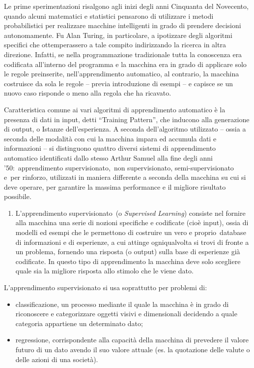 \documentclass[
  b5paper,
  twoside,
  11pt,
  chapterprefix=false,
  bibliography=totocnumbered,
  listof=flat]{scrbook}
\providecommand{\tightlist}{%
  \setlength{\itemsep}{0pt}\setlength{\parskip}{0pt}}
\begin{document}
Le prime sperimentazioni risalgono agli inizi degli anni Cinquanta del
Novecento, quando alcuni matematici e statistici pensarono di utilizzare
i metodi probabilistici per realizzare macchine intelligenti in grado di
prendere decisioni autonomamente. Fu Alan Turing, in particolare, a
ipotizzare degli algoritmi specifici che ottemperassero a tale compito
indirizzando la ricerca in altra direzione. Infatti, se nella
programmazione tradizionale tutta la conoscenza era codificata
all'interno del programma e la macchina era in grado di applicare solo
le regole preinserite, nell'apprendimento automatico, al contrario, la
macchina costruisce da sola le regole -- previa introduzione di esempi
-- e capisce se un nuovo caso risponde o meno alla regola che ha
ricavato.

Caratteristica comune ai vari algoritmi di apprendimento automatico è la
presenza di dati in input, detti \enquote{Training Pattern}, che inducono alla
generazione di output, o Istanze dell'esperienza. A seconda
dell'algoritmo utilizzato -- ossia a seconda delle modalità con cui la
macchina impara ed accumula dati e informazioni -- si distinguono
quattro diversi sistemi di apprendimento automatico identificati dallo
stesso Arthur Samuel alla fine degli anni '50:~apprendimento
supervisionato,~non supervisionato, semi-supervisionato e~per rinforzo,
utilizzati in maniera differente a seconda della macchina su cui si deve
operare, per garantire la massima performance e il migliore risultato
possibile.

\begin{enumerate}
\def\labelenumi{\arabic{enumi}.}
\tightlist
\item
  L'apprendimento supervisionato~(o \emph{Supervised Learning}) consiste
  nel fornire alla macchina una serie di nozioni specifiche e
  codificate (cioè input), ossia di modelli ed esempi che le
  permettono di costruire un vero e proprio~database di informazioni e
  di esperienze, a cui attinge ogniqualvolta si trovi di fronte a un
  problema, fornendo una risposta (o output) sulla base di esperienze
  già codificate. In questo tipo di apprendimento la macchina deve
  solo scegliere quale sia la migliore risposta allo stimolo che le
  viene dato.
\end{enumerate}

L'apprendimento supervisionato si usa soprattutto per problemi di:

\begin{itemize}
\item
  classificazione, un processo mediante il quale la macchina è in
  grado di riconoscere e categorizzare oggetti visivi e dimensionali
  decidendo a quale categoria appartiene un determinato dato;
\item
  regressione, corrispondente alla capacità della macchina di
  prevedere il valore futuro di un dato avendo il suo valore attuale
  (es. la quotazione delle valute o delle azioni di una società).
\end{itemize}
\end{document}
